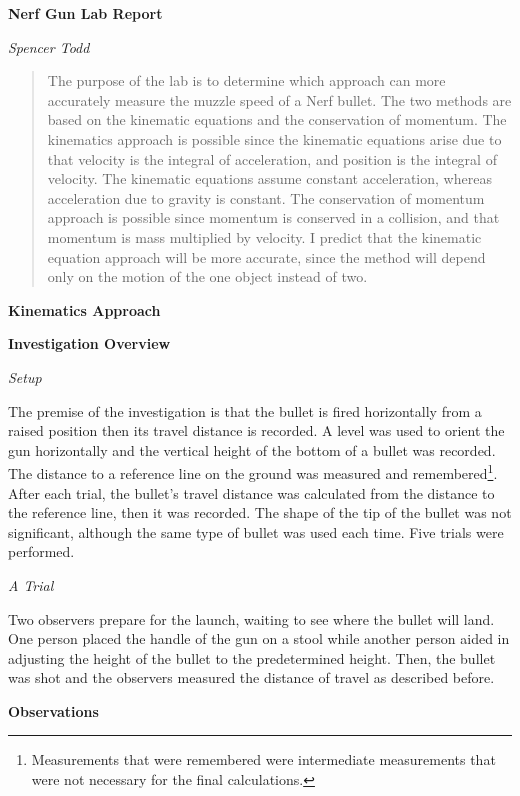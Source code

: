 \documentclass[12pt]{article}
\newcommand{\double}[0]{\par\null\par}
\newcommand{\bigheader}[1]{\LARGE\textbf{#1}\normalsize}
\newcommand{\header}[1]{\large\textbf{#1}\normalsize}
\newcommand{\lilheader}[1]{\textit{#1}}
\begin{document}
\bigheader{Nerf Gun Lab Report}

\lilheader{Spencer Todd}

\renewcommand{\abstractname}{Introduction}
\begin{abstract}\normalsize
The purpose of the lab is to determine which approach can more accurately measure the muzzle speed of a Nerf bullet. The two
methods are based on the kinematic equations and the conservation of momentum. The kinematics approach is possible since the
kinematic equations arise due to that velocity is the integral of acceleration, and position is the integral of velocity. The
kinematic equations assume constant acceleration, whereas acceleration due to gravity is constant. The conservation of momentum
approach is possible since momentum is conserved in a collision, and that momentum is mass multiplied by velocity. I predict that
the kinematic equation approach will be more accurate, since the method will depend only on the motion of the one object instead
of two.
\end{abstract}

\double\bigheader{Kinematics Approach}

\header{Investigation Overview}

\lilheader{Setup}

The premise of the investigation is that the bullet is fired horizontally from a raised position then its travel distance is
recorded. A level was used to orient the gun horizontally and the vertical height of the bottom of a bullet was recorded. The
distance to a reference line on the ground was measured and remembered\footnote{Measurements that were remembered were
intermediate measurements that were not necessary for the final calculations.}. After each trial, the bullet's travel distance
was calculated from the distance to the reference line, then it was recorded. The shape of the tip of the bullet was not
significant, although the same type of bullet was used each time. Five trials were performed.

\double\lilheader{A Trial}

Two observers prepare for the launch, waiting to see where the bullet will land. One person placed the handle of the gun on a
stool while another person aided in adjusting the height of the bullet to the predetermined height. Then, the bullet was shot and
the observers measured the distance of travel as described before.

\double\header{Observations}
\end{document}
